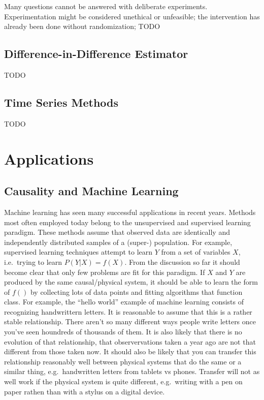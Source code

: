 \documentclass[
]{book}
\theoremstyle{definition}
\theoremstyle{definition}
\theoremstyle{definition}
\theoremstyle{remark}
\begin{document}
Many questions cannot be answered with deliberate experiments. Experimentation might be considered unethical or unfeasible; the intervention has already been done without randomization;
TODO

\hypertarget{difference-in-difference-estimator}{%
\section{Difference-in-Difference Estimator}\label{difference-in-difference-estimator}}

TODO

\hypertarget{time-series-methods}{%
\section{Time Series Methods}\label{time-series-methods}}

TODO

\hypertarget{applications}{%
\chapter{Applications}\label{applications}}

\hypertarget{causality-and-machine-learning}{%
\section{Causality and Machine Learning}\label{causality-and-machine-learning}}

Machine learning has seen many successful applications in recent years. Methods most often employed today belong to the unsupervised and supervised learning paradigm. These methods assume that observed data are identically and independently distributed samples of a (super-) population. For example, supervised learning techniques attempt to learn \(Y\) from a set of variables \(X\), i.e.~trying to learn \(P(Y|X) = f(X)\).
From the discussion so far it should become clear that only few problems are fit for this paradigm. If \(X\) and \(Y\) are produced by the same causal/physical system, it should be able to learn the form of \(f()\) by collecting lots of data points and fitting algorithms that function class. For example, the ``hello world'' example of machine learning consists of recognizing handwrittern letters. It is reasonable to assume that this is a rather stable relationship. There aren't so many different ways people write letters once you've seen houndreds of thousands of them. It is also likely that there is no evolution of that relationship, that observervations taken a year ago are not that different from those taken now. It should also be likely that you can transfer this relationship reasonably well between physical systems that do the same or a similar thing, e.g.~handwritten letters from tablets vs phones. Transfer will not as well work if the physical system is quite different, e.g.~writing with a pen on paper rathen than with a stylus on a digital device.
\end{document}
